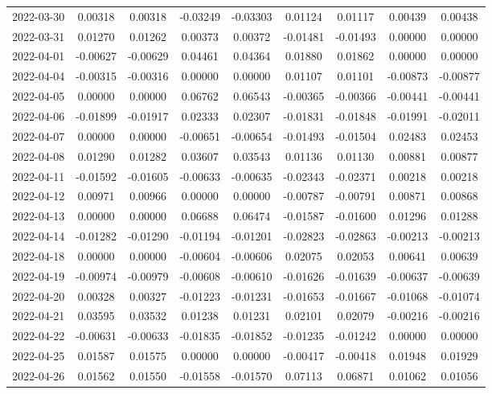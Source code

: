 \begin{footnotesize}
\begin{longtable}{lcccccccc}
2022-03-30 & 0.00318 & 0.00318 & -0.03249 & -0.03303 & 0.01124 & 0.01117 & 0.00439 & 0.00438 \\
2022-03-31 & 0.01270 & 0.01262 & 0.00373 & 0.00372 & -0.01481 & -0.01493 & 0.00000 & 0.00000 \\
2022-04-01 & -0.00627 & -0.00629 & 0.04461 & 0.04364 & 0.01880 & 0.01862 & 0.00000 & 0.00000 \\
2022-04-04 & -0.00315 & -0.00316 & 0.00000 & 0.00000 & 0.01107 & 0.01101 & -0.00873 & -0.00877 \\
2022-04-05 & 0.00000 & 0.00000 & 0.06762 & 0.06543 & -0.00365 & -0.00366 & -0.00441 & -0.00441 \\
2022-04-06 & -0.01899 & -0.01917 & 0.02333 & 0.02307 & -0.01831 & -0.01848 & -0.01991 & -0.02011 \\
2022-04-07 & 0.00000 & 0.00000 & -0.00651 & -0.00654 & -0.01493 & -0.01504 & 0.02483 & 0.02453 \\
2022-04-08 & 0.01290 & 0.01282 & 0.03607 & 0.03543 & 0.01136 & 0.01130 & 0.00881 & 0.00877 \\
2022-04-11 & -0.01592 & -0.01605 & -0.00633 & -0.00635 & -0.02343 & -0.02371 & 0.00218 & 0.00218 \\
2022-04-12 & 0.00971 & 0.00966 & 0.00000 & 0.00000 & -0.00787 & -0.00791 & 0.00871 & 0.00868 \\
2022-04-13 & 0.00000 & 0.00000 & 0.06688 & 0.06474 & -0.01587 & -0.01600 & 0.01296 & 0.01288 \\
2022-04-14 & -0.01282 & -0.01290 & -0.01194 & -0.01201 & -0.02823 & -0.02863 & -0.00213 & -0.00213 \\
2022-04-18 & 0.00000 & 0.00000 & -0.00604 & -0.00606 & 0.02075 & 0.02053 & 0.00641 & 0.00639 \\
2022-04-19 & -0.00974 & -0.00979 & -0.00608 & -0.00610 & -0.01626 & -0.01639 & -0.00637 & -0.00639 \\
2022-04-20 & 0.00328 & 0.00327 & -0.01223 & -0.01231 & -0.01653 & -0.01667 & -0.01068 & -0.01074 \\
2022-04-21 & 0.03595 & 0.03532 & 0.01238 & 0.01231 & 0.02101 & 0.02079 & -0.00216 & -0.00216 \\
2022-04-22 & -0.00631 & -0.00633 & -0.01835 & -0.01852 & -0.01235 & -0.01242 & 0.00000 & 0.00000 \\
2022-04-25 & 0.01587 & 0.01575 & 0.00000 & 0.00000 & -0.00417 & -0.00418 & 0.01948 & 0.01929 \\
2022-04-26 & 0.01562 & 0.01550 & -0.01558 & -0.01570 & 0.07113 & 0.06871 & 0.01062 & 0.01056 \\

\end{longtable}
\end{footnotesize}
